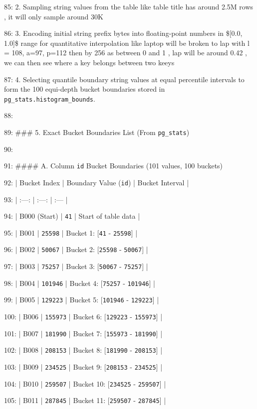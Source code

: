 \documentclass[11pt,a4paper]{article}
\begin{document}
85: 2. Sampling string values from the table like table title has around 2.5M rows , it will only sample around 30K

86: 3. Encoding initial string prefix bytes into floating-point numbers in \$[0.0, 1.0]\$ range for quantitative interpolation like laptop will be broken to lap with l = 108, a=97, p=112 then by 256 as between 0 and 1 , lap will be around 0.42 , we can then see where a key belongs between two keeys

87: 4. Selecting quantile boundary string values at equal percentile intervals to form the 100 equi-depth bucket boundaries stored in \texttt{pg\_stats.histogram\_bounds}.

88:

89: \#\#\# 5. Exact Bucket Boundaries List (From \texttt{pg\_stats})

90:

91: \#\#\#\# A. Column \texttt{id} Bucket Boundaries (101 values, 100 buckets)

92: | Bucket Index | Boundary Value (\texttt{id}) | Bucket Interval |

93: | :---: | :---: | :--- |

94: | B000 (Start) | \texttt{41} | Start of table data |

95: | B001 | \texttt{25598} | Bucket 1: [\texttt{41} - \texttt{25598}] |

96: | B002 | \texttt{50067} | Bucket 2: [\texttt{25598} - \texttt{50067}] |

97: | B003 | \texttt{75257} | Bucket 3: [\texttt{50067} - \texttt{75257}] |

98: | B004 | \texttt{101946} | Bucket 4: [\texttt{75257} - \texttt{101946}] |

99: | B005 | \texttt{129223} | Bucket 5: [\texttt{101946} - \texttt{129223}] |

100: | B006 | \texttt{155973} | Bucket 6: [\texttt{129223} - \texttt{155973}] |

101: | B007 | \texttt{181990} | Bucket 7: [\texttt{155973} - \texttt{181990}] |

102: | B008 | \texttt{208153} | Bucket 8: [\texttt{181990} - \texttt{208153}] |

103: | B009 | \texttt{234525} | Bucket 9: [\texttt{208153} - \texttt{234525}] |

104: | B010 | \texttt{259507} | Bucket 10: [\texttt{234525} - \texttt{259507}] |

105: | B011 | \texttt{287845} | Bucket 11: [\texttt{259507} - \texttt{287845}] |
\end{document}
